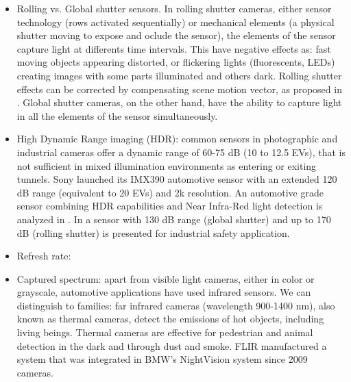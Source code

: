 \begin{itemize}
    \item Rolling vs. Global shutter sensors. In rolling
    shutter cameras, either sensor technology (rows activated sequentially) or
    mechanical elements (a physical shutter moving to expose and oclude the 
    sensor), the elements of the sensor capture light at differents time 
    intervals. This have negative effects as: fast moving objects appearing
    distorted, or flickering lights (fluorescents, LEDs) creating images with 
    some parts illuminated and others dark. Rolling shutter effects
    can be corrected by compensating scene motion vector, as proposed in 
    \cite{Chia-KaiLiang2008}\cite{Chun2008}.
    Global shutter cameras, on the other hand, have the ability to capture 
    light in all the elements of the sensor simultaneously.
    
    \item High Dynamic Range imaging (HDR): common sensors in photographic and 
    industrial cameras offer a dynamic range of 60-75 dB (10 to 12.5 EVs),
    that is not sufficient in mixed illumination environments as entering or 
    exiting tunnels. Sony launched its IMX390 automotive sensor with an
    extended 120 dB range (equivalent to 20 EVs) and 2k resolution. 
    An automotive grade sensor combining HDR capabilities and 
    Near Infra-Red light detection is analyzed in \cite{Maddalena2005}. 
    In \cite{Strobel2013} a sensor with 130 dB range (global shutter) and up
    to 170 dB (rolling shutter) is presented for industrial safety application. 
    
    \item Refresh rate:
    
    \item Captured spectrum: apart from visible light cameras, either in color
    or grayscale, automotive applications have used infrared sensors. We can 
    distinguish to families: far infrared cameras (wavelength 900-1400 nm), 
    also known as thermal cameras, detect the emissions of hot objects, 
    including living beings. Thermal cameras are effective for pedestrian and
    animal detection \cite{OMalley2008}\cite{Besbes2015} in the dark and 
    through dust and smoke. FLIR manufactured a system that was integrated
    in BMW's NightVision system since 2009 cameras.
\end{itemize} 

